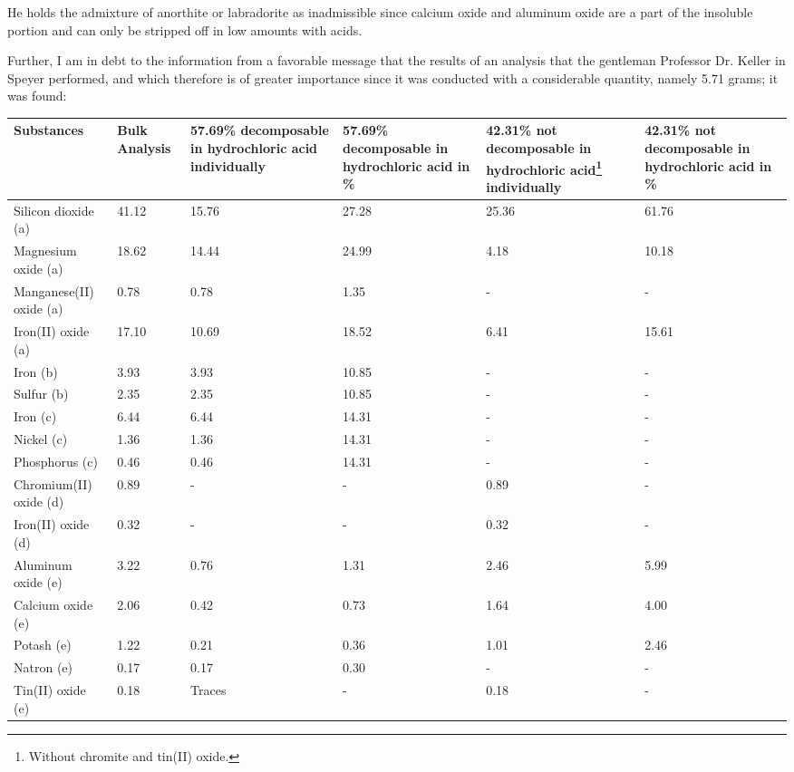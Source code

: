 \documentclass[a4paper, 12pt, oneside]{article}
\begin{document}
He holds the admixture of anorthite or labradorite as inadmissible since calcium oxide and aluminum oxide are a part of the insoluble portion and can only be stripped off in low amounts with acids.

Further, I am in debt to the information from a favorable message that the results of an analysis that the gentleman Professor Dr. Keller in Speyer performed, and which therefore is of greater importance since it was conducted with a considerable quantity, namely 5.71 grams; it was found:
\begin{center}
\scriptsize
    \tiny
    \begin{tabular}{ |p{1.4cm}|p{0.7cm}|p{1.2cm}|p{0.9cm}|p{1.3cm}|p{1.1cm}| }
        \hline
        Substances & \tiny{Bulk Analysis} & \tiny{57.69\% decomposable in hydrochloric acid individually} & \tiny{57.69\% decomposable in hydrochloric acid in \%} & \tiny{42.31\% not decomposable in hydrochloric acid\footnote{Without chromite and tin(II) oxide.} individually} & \tiny{42.31\% not decomposable in hydrochloric acid in \%}\\\hline
        Silicon dioxide (a) & 41.12 & 15.76 & 27.28 & 25.36 & 61.76\\\hline
        Magnesium oxide (a) & 18.62 & 14.44 & 24.99 & 4.18 & 10.18\\\hline
        Manganese(II) oxide (a) & 0.78 & 0.78 & 1.35 & - & -\\\hline
        Iron(II) oxide (a) & 17.10 & 10.69 & 18.52 & 6.41 & 15.61\\\hline
        Iron (b) & 3.93 & 3.93 & 10.85 & - & -\\\hline
        Sulfur (b) & 2.35 & 2.35 & 10.85 & - & -\\\hline
        Iron (c) & 6.44 & 6.44 & 14.31 & - & -\\\hline
        Nickel (c) & 1.36 & 1.36 & 14.31 & - & -\\\hline
        Phosphorus (c) & 0.46 & 0.46 & 14.31 & - & -\\\hline
        Chromium(II) oxide (d) & 0.89 & - & - & 0.89 & -\\\hline
        Iron(II) oxide (d) & 0.32 & - & - & 0.32 & -\\\hline
        Aluminum oxide (e) & 3.22 & 0.76 & 1.31 & 2.46 & 5.99\\\hline
        Calcium oxide (e) & 2.06 & 0.42 & 0.73 & 1.64 & 4.00\\\hline
        Potash (e) & 1.22 & 0.21 & 0.36 & 1.01 & 2.46\\\hline
        Natron (e) & 0.17 & 0.17 & 0.30 & - & -\\\hline
        Tin(II) oxide (e) & 0.18 & Traces & - & 0.18 & -\\
        \hline
    \end{tabular}
\end{center}
\end{document}
